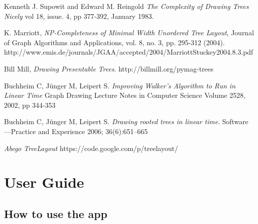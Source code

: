\documentclass{report}
\begin{document}
\begin{thebibliography}{9}
  Kenneth J. Supowit and Edward M. Reingold
  \emph{The Complexity of Drawing Trees Nicely}
  vol 18, issue. 4, pp 377-392,
  January 1983.

  K. Marriott, 
  \emph{NP-Completeness of Minimal Width Unordered Tree Layout}, 
  Journal of Graph Algorithms and Applications, 
  vol. 8, no. 3, pp. 295-312 (2004).
  http://www.emis.de/journals/JGAA/accepted/2004/MarriottStuckey2004.8.3.pdf

  Bill Mill,
  \emph{Drawing Presentable Trees}.
  http://billmill.org/pymag-trees

  Buchheim C, J\"unger M, Leipert S. 
  \emph{Improving Walker's Algorithm to Run in Linear Time}
  Graph Drawing Lecture Notes in Computer Science Volume 2528, 
  2002, pp 344-353

  Buchheim C, J\"unger M, Leipert S. 
  \emph{Drawing rooted trees in linear time}. 
  Software—Practice and Experience 2006; 36(6):651–665

  \emph{Abego TreeLayout}
  https://code.google.com/p/treelayout/

\end{thebibliography}

\chapter{User Guide}
\section{How to use the app}
\end{document}
